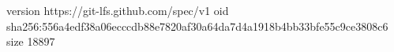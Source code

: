 version https://git-lfs.github.com/spec/v1
oid sha256:556a4edf38a06ecccdb88e7820af30a64da7d4a1918b4bb33bfe55c9ce3808c6
size 18897
